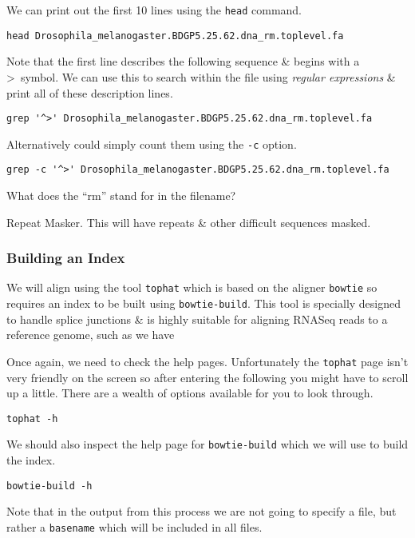 \begin{steps}
We can print out the first 10 lines using the \texttt{head} command.
\begin{lstlisting}
head Drosophila_melanogaster.BDGP5.25.62.dna_rm.toplevel.fa    
\end{lstlisting}
Note that the first line describes the following sequence \& begins with a \textgreater ~symbol.
We can use this to search within the file using \textit{regular expressions} \& print all of these description lines.
\begin{lstlisting}
grep '^>' Drosophila_melanogaster.BDGP5.25.62.dna_rm.toplevel.fa
\end{lstlisting}
Alternatively could simply count them using the \texttt{-c} option.
\begin{lstlisting}
grep -c '^>' Drosophila_melanogaster.BDGP5.25.62.dna_rm.toplevel.fa  
\end{lstlisting}
\end{steps}

\begin{questions}
What does the ``rm'' stand for in the filename?\\
\begin{answer}
Repeat Masker. This will have repeats \& other difficult sequences masked.
\end{answer}
\end{questions}

\subsubsection{Building an Index}
We will align using the tool \texttt{tophat} which is based on the aligner \texttt{bowtie} so requires an index to be built using \texttt{bowtie-build}. 
This tool is specially designed to handle splice junctions \& is highly suitable for aligning RNASeq reads to a reference genome, such as we have\\

\begin{steps}
Once again, we need to check the help pages.
Unfortunately the \texttt{tophat} page isn't very friendly on the screen so after entering the following you might have to scroll up a little.
There are a wealth of options available for you to look through.\\
\begin{lstlisting}
tophat -h
\end{lstlisting}

We should also inspect the help page for \texttt{bowtie-build} which we will use to build the index.\\
\begin{lstlisting}
bowtie-build -h
\end{lstlisting}
Note that in the output from this process we are not going to specify a file, but rather a \texttt{basename} which will be included in all files.
\end{steps}

